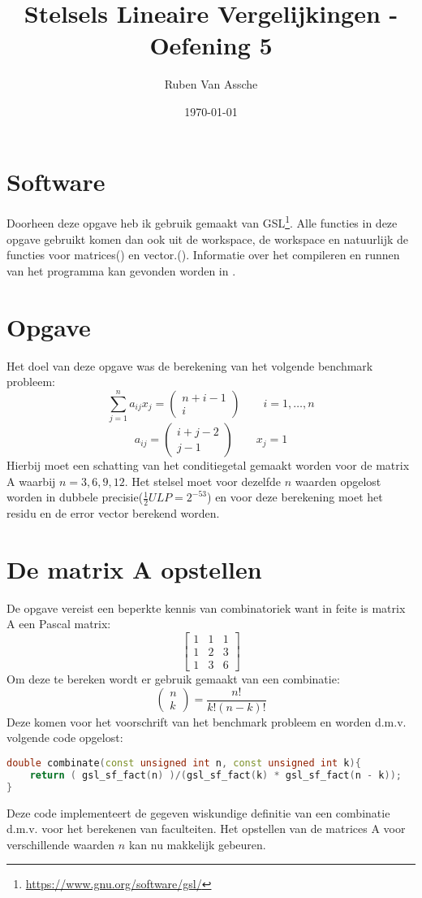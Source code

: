 \documentclass[10pt,a4paper,twocolumn]{article}
\author{Ruben Van Assche}
\title{Stelsels Lineaire Vergelijkingen - Oefening 5}
\date{\today}
\begin{document}
\maketitle
\section{Software}
Doorheen deze opgave heb ik gebruik gemaakt van GSL\footnote{\url{https://www.gnu.org/software/gsl/}}. Alle functies in deze opgave gebruikt komen dan ook uit de \texttt{} workspace, de \texttt{} workspace en natuurlijk de functies voor matrices(\texttt{}) en vector.(\texttt{}).
\newline
\newline
Informatie over het compileren en runnen van het programma kan gevonden worden in \texttt{}.
\section{Opgave}
Het doel van deze opgave was de berekening van het volgende benchmark probleem:
$$\sum^{n}_{j = 1}a_{ij}x_{j} = \begin{pmatrix}
n + i - 1\\ 
i
\end{pmatrix} \qquad  i = 1,\hdots,n$$
$$a_{ij} = \begin{pmatrix}
i + j - 2\\
j - 1
\end{pmatrix} \qquad  x_{j}= 1$$
Hierbij moet een schatting van het conditiegetal gemaakt worden voor de matrix A waarbij $n = 3,6,9,12$. Het stelsel moet voor dezelfde $n$ waarden opgelost worden in dubbele precisie($\frac{1}{2}ULP = 2^{-53}$) en voor deze berekening moet het residu en de error vector berekend worden.
\section{De matrix A opstellen}
De opgave vereist een beperkte kennis van combinatoriek want in feite is matrix A een Pascal matrix:
$$
\begin{bmatrix}
1 & 1  & 1 \\ 
1 & 2 & 3\\ 
1 & 3 & 6
\end{bmatrix}
$$
Om deze te bereken wordt er gebruik gemaakt van een combinatie:
$$
\begin{pmatrix}
n\\ 
k
\end{pmatrix} = \frac{n!}{k!(n-k)!}
$$
Deze komen voor het voorschrift van het benchmark probleem en worden d.m.v. volgende code opgelost:
\begin{lstlisting}[language=C++]
double combinate(const unsigned int n, const unsigned int k){
    return ( gsl_sf_fact(n) )/(gsl_sf_fact(k) * gsl_sf_fact(n - k));
}
\end{lstlisting}
Deze code implementeert de gegeven wiskundige definitie van een combinatie d.m.v. \texttt{} voor het berekenen van faculteiten.
\newline
\newline
Het opstellen van de  matrices A voor verschillende waarden $n$ kan nu makkelijk gebeuren.
\end{document}
